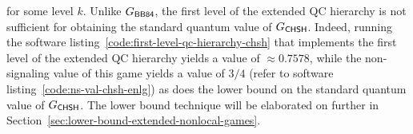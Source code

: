 for some level $k$. Unlike $G_{\BB84}$, the first level of the extended QC hierarchy is not sufficient for obtaining the standard quantum value of $G_{\mathsf{CHSH}}$. Indeed, running the software listing~\ref{code:first-level-qc-hierarchy-chsh} that implements the first level of the extended QC hierarchy yields a value of $\approx 0.7578$, while the non-signaling value of this game yields a value of $3/4$ (refer to software listing~\ref{code:ns-val-chsh-enlg}) as does the lower bound on the standard quantum value of $G_{\mathsf{CHSH}}$. The lower bound technique will be elaborated on further in Section~\ref{sec:lower-bound-extended-nonlocal-games}.



